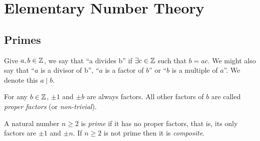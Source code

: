 \documentclass[../main.tex]{subfiles}
\begin{document}
\chapter{Elementary Number Theory}
\section{Primes}
\begin{definition}[Divisibility]
  Give $a, b \in \mathbb{Z}$, we say that ``a divides b'' if $\exists c \in \mathbb{Z}$ such that $b = ac$.
  We might also say that ``$a$ is a divisor of b'', ``$a$ is a factor of $b$'' or ``$b$ is a multiple of $a$''.
  We denote this $a \mid b$.
\end{definition}
For any $b \in \mathbb{Z}$, $\pm1$ and $\pm b$ are always factors.
All other factors of $b$ are called \textit{proper factors} (or \textit{non-trivial}).
\begin{definition}
  A natural number $n \geq 2$ is \textit{prime} if it has no proper factors, that is, its only factors are $\pm 1$ and $\pm n$.
  If $n \geq 2$ is not prime then it is \textit{composite}.
\end{definition}
\end{document}
